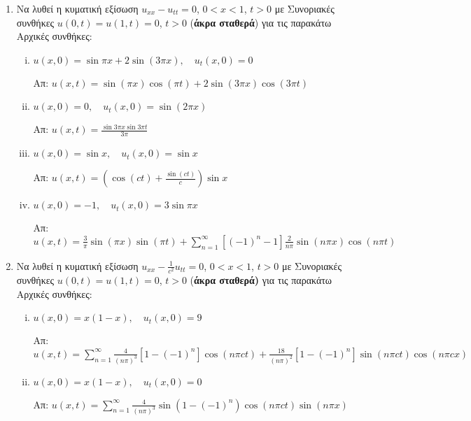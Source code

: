 \begin{enumerate}

	\item Να λυθεί η κυματική εξίσωση $ u_{xx}-u_{tt} = 0 $, $ 0<x<1 $, $ t>0 $ με Συνοριακές
		συνθήκες $ u(0,t)=u(1,t)=0 $, $ t>0 $ (\textbf{άκρα σταθερά}) για τις παρακάτω Αρχικές συνθήκες: 
		\begin{enumerate}[(i)]
			\item $ u(x,0) = \sin{\pi x} + 2 \sin{(3 \pi x)},\quad  u_t(x,0) = 0 $

				\hfill Απ: $ u(x,t) = \sin{(\pi x)} \cos{(\pi t)} + 2 \sin{(3\pi x)} \cos{(3\pi t)} $
		\item $ u(x,0) = 0,\quad  u_t(x,0) = \sin{(2\pi x)} $

			\hfill Απ: $ u(x,t) = \frac{\sin{3\pi x} \sin{3\pi t}}{ 3\pi } $

		\item $ u(x,0) = \sin{x}, \quad u_t(x,0) = \sin{x} $

			\hfill Απ: $ u(x,t) = \left(\cos{(ct)} + \frac{\sin (ct) }{ c }\right) \sin{x}  $ 

		\item $ u(x,0) = -1,\quad u_t(x,0) = 3 \sin{\pi x} $

			\hfill Απ: $ u(x,t) = \frac{ 3 }{ \pi } \sin{(\pi x)} \sin{(\pi t)} +
			\sum_{n=1}^{\infty} [(-1)^{n}-1] \frac{ 2 }{ n\pi } \sin{(n\pi x)} \cos{(n\pi t)}$ 

\end{enumerate}

\item Να λυθεί η κυματική εξίσωση $ u_{xx} - \frac{1}{ c^{2} } u_{tt} = 0 $, $ 0<x<1 $, $ t>0
	$ με Συνοριακές συνθήκες $ u(0,t) = u(1,t) = 0 $, $ t>0 $ (\textbf{άκρα σταθερά)} για τις παρακάτω Αρχικές συνθήκες:

	\begin{enumerate}[(i)]
		\item $ u(x,0) = x(1-x), \quad u_t(x,0) = 9$ 


			\hfill Απ: $ u(x,t) = \sum_{n=1}^{\infty} \frac{ 4 }{ (n\pi)^{3} } [1-(-1)^{n}]
			\cos{(n\pi c t)} + \frac{ 18 }{ (n\pi)^{2} } [1-(-1)^{n}] \sin{(n\pi c t)} \cos{(n\pi c
			x)} $
			 
		\item $ u(x,0) = x(1-x), \quad u_t(x,0) = 0 $ 

			\hfill Απ: $ u(x,t) = \sum_{n=1}^{\infty} \frac{ 4 }{ (n\pi)^{3} } \sin{(1-(-1)^{n})}
			\cos{(n\pi c t)} \sin{(n\pi x)}  $

		\end{enumerate}



\end{enumerate}
